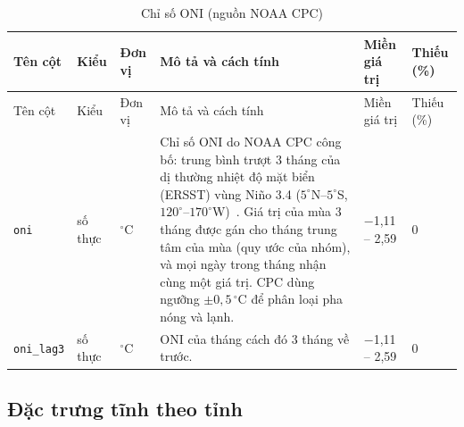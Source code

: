 \documentclass[12pt,a4paper]{article}
\begin{document}
\begin{longtable}{@{}>{\raggedright\arraybackslash}p{2.6cm}>{\raggedright\arraybackslash}p{1.35cm}>{\raggedright\arraybackslash}p{1.1cm}>{\raggedright\arraybackslash}p{5.1cm}>{\raggedright\arraybackslash}p{2.0cm}>{\raggedright\arraybackslash}p{1.0cm}@{}}
\caption{Chỉ số ONI (nguồn NOAA CPC)}\label{tab:enso}\\
\toprule
Tên cột & Kiểu & Đơn vị & Mô tả và cách tính & Miền giá trị & Thiếu (\%) \\
\midrule
\endfirsthead
\toprule
Tên cột & Kiểu & Đơn vị & Mô tả và cách tính & Miền giá trị & Thiếu (\%) \\
\midrule
\endhead
\bottomrule
\endfoot
\texttt{oni} & số thực & $^\circ$C & Chỉ số ONI do NOAA CPC công bố: trung bình trượt 3 tháng của dị thường nhiệt độ mặt biển (ERSST) vùng Niño 3.4 ($5^\circ$N--$5^\circ$S, $120^\circ$--$170^\circ$W)~\cite{noaaoni}. Giá trị của mùa 3 tháng được gán cho tháng trung tâm của mùa (quy ước của nhóm), và mọi ngày trong tháng nhận cùng một giá trị. CPC dùng ngưỡng $\pm 0{,}5\,^\circ$C để phân loại pha nóng và lạnh. & $-$1{,}11 -- 2{,}59 & 0{,}0 \\
\texttt{oni\_\allowbreak lag3} & số thực & $^\circ$C & ONI của tháng cách đó 3 tháng về trước. & $-$1{,}11 -- 2{,}59 & 0{,}0 \\
\end{longtable}

\subsection{Đặc trưng tĩnh theo tỉnh}
\end{document}
